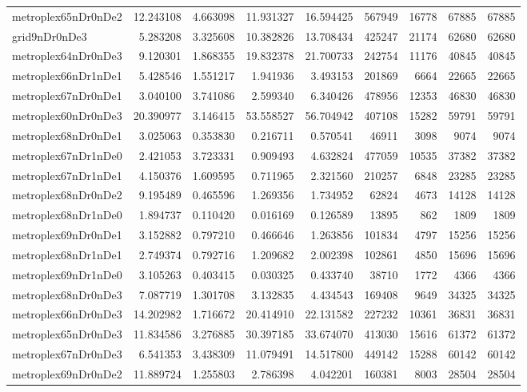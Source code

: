 \begin{longtable}{|l|r|r|r|r|r|r|r|r|}
metroplex65nDr0nDe2 & 12.243108 & 4.663098 & 11.931327 & 16.594425 & 567949 & 16778 & 67885 & 67885 \\
grid9nDr0nDe3 & 5.283208 & 3.325608 & 10.382826 & 13.708434 & 425247 & 21174 & 62680 & 62680 \\
metroplex64nDr0nDe3 & 9.120301 & 1.868355 & 19.832378 & 21.700733 & 242754 & 11176 & 40845 & 40845 \\
metroplex66nDr1nDe1 & 5.428546 & 1.551217 & 1.941936 & 3.493153 & 201869 & 6664 & 22665 & 22665 \\
metroplex67nDr0nDe1 & 3.040100 & 3.741086 & 2.599340 & 6.340426 & 478956 & 12353 & 46830 & 46830 \\
metroplex60nDr0nDe3 & 20.390977 & 3.146415 & 53.558527 & 56.704942 & 407108 & 15282 & 59791 & 59791 \\
metroplex68nDr0nDe1 & 3.025063 & 0.353830 & 0.216711 & 0.570541 & 46911 & 3098 & 9074 & 9074 \\
metroplex67nDr1nDe0 & 2.421053 & 3.723331 & 0.909493 & 4.632824 & 477059 & 10535 & 37382 & 37382 \\
metroplex67nDr1nDe1 & 4.150376 & 1.609595 & 0.711965 & 2.321560 & 210257 & 6848 & 23285 & 23285 \\
metroplex68nDr0nDe2 & 9.195489 & 0.465596 & 1.269356 & 1.734952 & 62824 & 4673 & 14128 & 14128 \\
metroplex68nDr1nDe0 & 1.894737 & 0.110420 & 0.016169 & 0.126589 & 13895 & 862 & 1809 & 1809 \\
metroplex69nDr0nDe1 & 3.152882 & 0.797210 & 0.466646 & 1.263856 & 101834 & 4797 & 15256 & 15256 \\
metroplex68nDr1nDe1 & 2.749374 & 0.792716 & 1.209682 & 2.002398 & 102861 & 4850 & 15696 & 15696 \\
metroplex69nDr1nDe0 & 3.105263 & 0.403415 & 0.030325 & 0.433740 & 38710 & 1772 & 4366 & 4366 \\
metroplex68nDr0nDe3 & 7.087719 & 1.301708 & 3.132835 & 4.434543 & 169408 & 9649 & 34325 & 34325 \\
metroplex66nDr0nDe3 & 14.202982 & 1.716672 & 20.414910 & 22.131582 & 227232 & 10361 & 36831 & 36831 \\
metroplex65nDr0nDe3 & 11.834586 & 3.276885 & 30.397185 & 33.674070 & 413030 & 15616 & 61372 & 61372 \\
metroplex67nDr0nDe3 & 6.541353 & 3.438309 & 11.079491 & 14.517800 & 449142 & 15288 & 60142 & 60142 \\
metroplex69nDr0nDe2 & 11.889724 & 1.255803 & 2.786398 & 4.042201 & 160381 & 8003 & 28504 & 28504 \\

\end{longtable}
